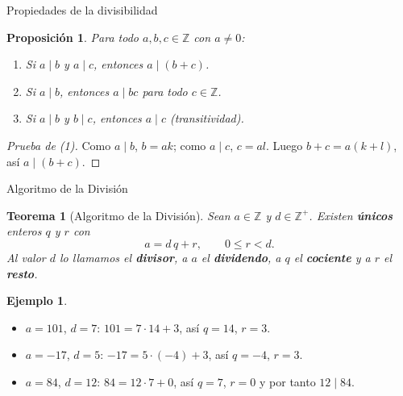 \documentclass[10pt,aspectratio=169]{beamer}
\theoremstyle{definition}
\newtheorem{ejemplo}{Ejemplo}
\theoremstyle{plain}
\newtheorem{teorema}{Teorema}
\newtheorem{proposicion}{Proposición}
\theoremstyle{remark}
\newcommand{\Z}{\mathbb{Z}}
\begin{document}
\begin{frame}{Propiedades de la divisibilidad}
  \begin{proposicion}
    Para todo $a,b,c\in\Z$ con $a\ne 0$:
    \begin{enumerate}
      \item Si $a\mid b$ y $a\mid c$, entonces $a\mid (b+c)$.
      \item Si $a\mid b$, entonces $a\mid bc$ para todo $c\in\Z$.
      \item Si $a\mid b$ y $b\mid c$, entonces $a\mid c$
            (transitividad).
    \end{enumerate}
  \end{proposicion}
  \begin{proof}[Prueba de (1)]
    Como $a\mid b$, $b=ak$; como $a\mid c$, $c=al$. Luego
    $b+c = a(k+l)$, así $a\mid(b+c)$.
  \end{proof}
\end{frame}

\begin{frame}{Algoritmo de la División}
  \begin{teorema}[Algoritmo de la División]
    Sean $a\in\Z$ y $d\in\Z^+$. Existen \textbf{únicos} enteros $q$ y $r$
    con
    \[
      a = d\,q + r,\qquad 0 \le r < d.
    \]
    Al valor $d$ lo llamamos el \textbf{divisor}, a $a$ el
    \textbf{dividendo}, a $q$ el \textbf{cociente} y a $r$ el
    \textbf{resto}.
  \end{teorema}
  \vspace{0.3em}
  \begin{ejemplo}
    \begin{itemize}
      \item $a=101$, $d=7$: $101 = 7\cdot 14 + 3$, así $q=14$, $r=3$.
      \item $a=-17$, $d=5$: $-17 = 5\cdot(-4) + 3$, así $q=-4$, $r=3$.
      \item $a=84$, $d=12$: $84 = 12\cdot 7 + 0$, así $q=7$, $r=0$ y
            por tanto $12\mid 84$.
    \end{itemize}
  \end{ejemplo}
\end{frame}
\end{document}
